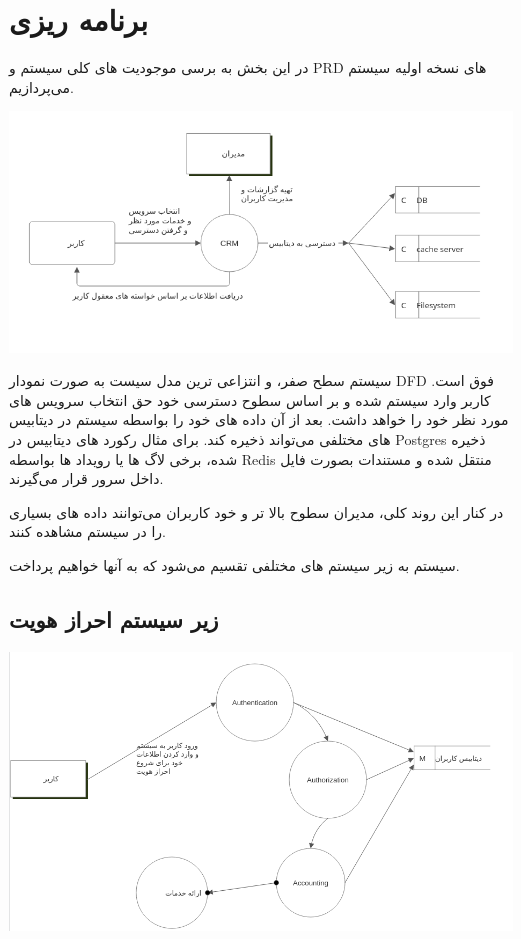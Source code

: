 \newpage

\section{برنامه ریزی}
در این بخش به برسی موجودیت های کلی سیستم و PRD های نسخه اولیه سیستم می‌پردازیم.

\includegraphics[scale=0.8]{assets/0_level_system.png}

سیستم سطح صفر، و انتزاعی ترین مدل سیست به صورت نمودار DFD فوق است.
کاربر وارد سیستم شده و بر اساس سطوح دسترسی خود حق انتخاب سرویس های مورد نظر خود را خواهد داشت. بعد از آن
داده های خود را بواسطه سیستم در دیتابیس های مختلفی می‌تواند ذخیره کند.
برای مثال رکورد های دیتابیس در Postgres ذخیره شده، برخی لاگ ها یا رویداد ها بواسطه Redis منتقل شده و مستندات بصورت فایل داخل سرور قرار می‌گیرند.

در کنار این روند کلی، مدیران سطوح بالا تر و خود کاربران می‌توانند داده های بسیاری را در سیستم مشاهده کنند.

سیستم به زیر سیستم های مختلفی تقسیم می‌شود که به آنها خواهیم پرداخت.

\subsection{زیر سیستم احراز هویت}
\includegraphics[scale=0.8]{assets/auth_dfd.png}

